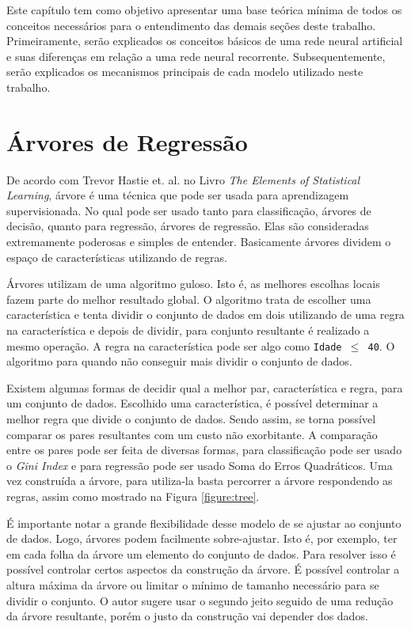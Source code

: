 Este capítulo tem como objetivo apresentar uma base teórica mínima de todos os conceitos necessários para o entendimento das demais seções deste trabalho. Primeiramente, serão explicados os conceitos básicos de uma rede neural artificial e suas diferenças em relação a uma rede neural recorrente. Subsequentemente, serão explicados os mecanismos principais de cada modelo utilizado neste trabalho.

\section{Árvores de Regressão}

De acordo com Trevor Hastie et. al. no Livro \textit{The Elements of Statistical Learning}, árvore é uma técnica que pode ser usada para aprendizagem supervisionada. No qual pode ser usado tanto para classificação, árvores de decisão, quanto para regressão, árvores de regressão. Elas são consideradas extremamente poderosas e simples de entender. Basicamente árvores dividem o espaço de características utilizando de regras.

Árvores utilizam de uma algoritmo guloso. Isto é, as melhores escolhas locais fazem parte do melhor resultado global. O algoritmo trata de escolher uma característica e tenta dividir o conjunto de dados em dois utilizando de uma regra na característica e depois de dividir, para conjunto resultante é realizado a mesmo operação. A regra na característica pode ser algo como \texttt{Idade \(\leq\) 40}. O algoritmo para quando não conseguir mais dividir o conjunto de dados.

Existem algumas formas de decidir qual a melhor par, característica e regra, para um conjunto de dados. Escolhido uma característica, é possível determinar a melhor regra que divide o conjunto de dados. Sendo assim, se torna possível comparar os pares resultantes com um custo não exorbitante. A comparação entre os pares pode ser feita de diversas formas, para classificação pode ser usado o \textit{Gini Index} e para regressão pode ser usado Soma do Erros Quadráticos. Uma vez construída a árvore, para utiliza-la basta percorrer a árvore respondendo as regras, assim como mostrado na Figura \ref{figure:tree}.

É importante notar a grande flexibilidade desse modelo de se ajustar ao conjunto de dados. Logo, árvores podem facilmente sobre-ajustar. Isto é, por exemplo, ter em cada folha da árvore um elemento do conjunto de dados. Para resolver isso é possível controlar certos aspectos da construção da árvore. É possível controlar a altura máxima da árvore ou limitar o mínimo de tamanho necessário para se dividir o conjunto. O autor sugere usar o segundo jeito seguido de uma redução da árvore resultante, porém o justo da construção vai depender dos dados.
 
